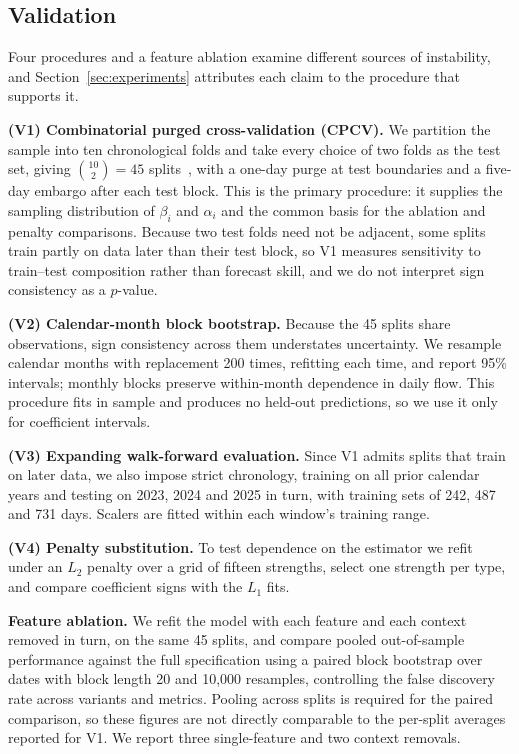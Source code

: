 \documentclass[sigconf,anonymous,review]{acmart}
\begin{document}
\subsection{Validation}
\label{sec:method-validation}

Four procedures and a feature ablation examine different sources of
instability, and Section~\ref{sec:experiments} attributes each claim to
the procedure that supports it.

\textbf{(V1) Combinatorial purged cross-validation (CPCV).} We partition the
sample into ten chronological folds and take every choice of two folds as
the test set, giving $\binom{10}{2} = 45$
splits~\cite{lopezdeprado2018}, with a one-day purge at test boundaries
and a five-day embargo after each test block. This is the primary
procedure: it supplies the sampling distribution of $\beta_i$ and
$\alpha_i$ and the common basis for the ablation and penalty comparisons.
Because two test folds need not be adjacent, some splits train partly on
data later than their test block, so V1 measures sensitivity to
train--test composition rather than forecast skill, and we do not
interpret sign consistency as a $p$-value.

\textbf{(V2) Calendar-month block bootstrap.} Because the 45 splits share
observations, sign consistency across them understates uncertainty. We
resample calendar months with replacement 200 times, refitting each time,
and report 95\% intervals; monthly blocks preserve within-month
dependence in daily flow. This procedure fits in sample and produces no
held-out predictions, so we use it only for coefficient intervals.

\textbf{(V3) Expanding walk-forward evaluation.} Since V1 admits splits
that train on later data, we also impose strict chronology, training on
all prior calendar years and testing on 2023, 2024 and 2025 in turn, with
training sets of 242, 487 and 731 days. Scalers are fitted within each
window's training range.

\textbf{(V4) Penalty substitution.} To test dependence on the estimator
we refit under an $L_2$ penalty over a grid of fifteen strengths, select
one strength per type, and compare coefficient signs with the $L_1$ fits.

\textbf{Feature ablation.} We refit the model with each feature and each
context removed in turn, on the same 45 splits, and compare pooled
out-of-sample performance against the full specification using a paired
block bootstrap over dates with block length 20 and 10{,}000 resamples,
controlling the false discovery rate across variants and metrics. Pooling
across splits is required for the paired comparison, so these figures are
not directly comparable to the per-split averages reported for V1. We
report three single-feature and two context removals.
\end{document}
